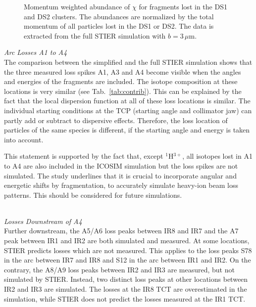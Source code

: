 \begin{figure}[t]
  \centering
\caption{Momentum weighted abundance of $\chi$ for fragments lost in the DS1 and DS2 clusters. The abundances are normalized by the total momentum of all particles lost in the DS1 or DS2. The data is extracted from the full STIER simulation with $b=3\,\mu$m.}
\label{fig:15032102}
  \end{figure}

\newpage

\textit{Arc Losses A1 to A4}
\\
The comparison between the simplified and the full STIER simulation shows that the three measured loss spikes A1, A3 and A4 become visible when the angles and energies of the fragments are included. The isotope composition at these locations is very similar (see Tab.~\ref{tab:contrib}). This can be explained by the fact that the local dispersion function at all of these loss locations is similar. The individual starting conditions at the TCP (starting angle and collimator jaw) can partly add or subtract to dispersive effects. Therefore, the loss location of particles of the same species is different, if the starting angle and energy is taken into account.

This statement is supported by the fact that, except $^1$H$^{3+}$, all isotopes lost in A1 to A4 are also included in the ICOSIM simulation but the loss spikes are not simulated.  The study underlines that it is crucial to incorporate angular and energetic shifts by fragmentation, to accurately simulate heavy-ion beam loss patterns. This should be considered for future simulations.

\mbox{} \\ 
\textit{Losses Downstream of A4}
\\
Further downstream, the A5/A6 loss peaks between IR8 and IR7 and the A7 peak between IR1 and IR2 are both simulated and measured. At some locations, STIER predicts losses which are not measured. This applies to the loss peaks S78 in the arc between IR7 and IR8 and S12 in the arc between IR1 and IR2. On the contrary, the A8/A9 loss peaks between IR2 and IR3  are measured, but not simulated by STIER. Instead, two distinct loss peaks at other locations between IR2 and IR3 are simulated. The losses at the IR8 TCT are overestimated in the simulation, while STIER does not predict the losses measured at the IR1 TCT.

